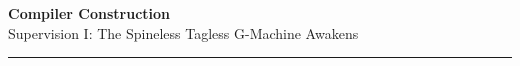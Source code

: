 \documentclass[10pt,a4paper]{exam} %
\begin{document}
\newcommand{\course}{Compiler Construction}
\newcommand{\week}{I}

\everymath{\color{campurpledark}}
\everydisplay{\color{campurpledark}}




\marksnotpoints
\pointsdroppedatright
\marksnotpoints
\marginpointname{ \points}

\begin{center}
\LARGE {\textbf{\color{campurpledark} \course} }\\[-0.2cm]
\Large \color{campurpledark} Supervision \week: The Spineless Tagless G-Machine Awakens\\
\end{center}

{\color{campurple}\hrule}

\newcommand{\metavar}[1]{{\color{campurple}#1}}

\vspace{0.5cm}

\newcommand{\terminal}[1]{\texttt{\color{campurple}#1}}
\newcommand{\bl}[1]{{\color{black}#1}}

\end{document}
